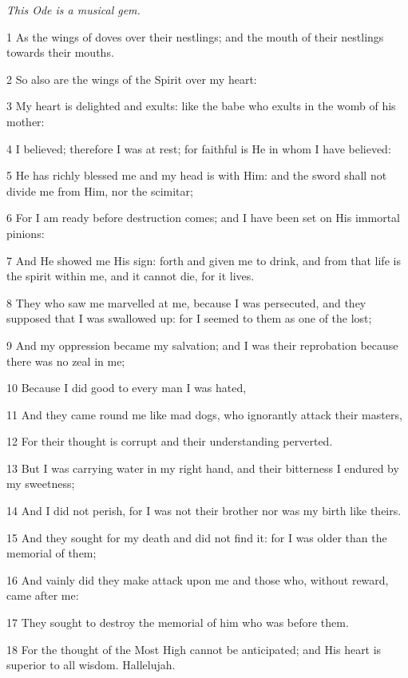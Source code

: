\par \textit{This Ode is a musical gem.}

\par 1 As the wings of doves over their nestlings; and the mouth of their nestlings towards their mouths.
\par 2 So also are the wings of the Spirit over my heart:
\par 3 My heart is delighted and exults: like the babe who exults in the womb of his mother:
\par 4 I believed; therefore I was at rest; for faithful is He in whom I have believed:
\par 5 He has richly blessed me and my head is with Him: and the sword shall not divide me from Him, nor the scimitar;
\par 6 For I am ready before destruction comes; and I have been set on His immortal pinions:
\par 7 And He showed me His sign: forth and given me to drink, and from that life is the spirit within me, and it cannot die, for it lives.
\par 8 They who saw me marvelled at me, because I was persecuted, and they supposed that I was swallowed up: for I seemed to them as one of the lost;
\par 9 And my oppression became my salvation; and I was their reprobation because there was no zeal in me;
\par 10 Because I did good to every man I was hated,
\par 11 And they came round me like mad dogs, who ignorantly attack their masters,
\par 12 For their thought is corrupt and their understanding perverted.
\par 13 But I was carrying water in my right hand, and their bitterness I endured by my sweetness;
\par 14 And I did not perish, for I was not their brother nor was my birth like theirs.
\par 15 And they sought for my death and did not find it: for I was older than the memorial of them;
\par 16 And vainly did they make attack upon me and those who, without reward, came after me:
\par 17 They sought to destroy the memorial of him who was before them.
\par 18 For the thought of the Most High cannot be anticipated; and His heart is superior to all wisdom. Hallelujah.

